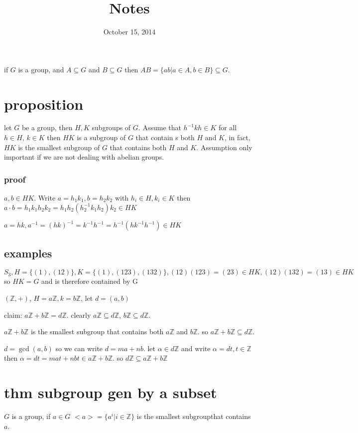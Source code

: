 \documentclass[letterpaper]{article}
\begin{document}
\title{Notes}
\date{October 15, 2014}
\maketitle
if $G$ is a group, and $A\subseteq G$ and $B\subseteq G$ then $AB=\{ab|a\in A, b\in B\}\subseteq G$.

\section*{proposition}

let $G$ be a group, then $H,K$ subgroups of $G$. Assume that $h^{-1}kh\in K$ for all $h\in H$, $k\in K$ then $HK$ is a subgroup of $G$ that contain s both $H$ and $K$, in fact, $HK$ is the smallest subgroup of $G$ that contains both $H$ and $K$. Assumption only important if we are not dealing with abelian groups.

\subsubsection*{proof}
$a,b\in HK$. Write $a=h_1k_1,b=h_2k_2$ with $h_i\in H,k_i\in K$ then $a\cdot b=h_1k_1h_2k_2=h_1h_2(h_2^{-1}k_1h_2)k_2\in HK$

$a=hk, a^{-1}=(hk)^{-1}=k^{-1}h^{-1}=h^{-1}(hk^{-1}h^{-1})\in HK$

\subsection*{examples}
$S_3, H=\{(1),(12)\}, K=\{(1),(123),(132)\}, (12)(123)=(23)\in HK, (12)(132)=(13)\in HK$ so $HK=G$ and is therefore contained by G

$(\mathbb{Z},+)$, $H=a\mathbb{Z}, k=b\mathbb{Z}$, let $d=(a,b)$

claim: $a\mathbb{Z}+b\mathbb{Z}=d\mathbb{Z}$. clearly $a\mathbb{Z}\subseteq d\mathbb{Z}$, $b\mathbb{Z}\subseteq d\mathbb{Z}$. 

$a\mathbb{Z}+b\mathbb{Z}$ is the smallest subgroup that contains both $a\mathbb{Z}$ and $b\mathbb{Z}$. so $a\mathbb{Z}+b\mathbb{Z}\subseteq d\mathbb{Z}$.

$d=\gcd(a,b)$ so we can write $d=ma+nb$. let $\alpha\in d\mathbb{Z}$ and write $\alpha=dt, t\in \mathbb{Z}$ then $\alpha=dt=mat+nbt\in a\mathbb{Z}+b\mathbb{Z}$. so $d\mathbb{Z}\subseteq a\mathbb{Z}+b\mathbb{Z}$ 
\section*{thm subgroup gen by a subset}
$G$ is a group, if $a\in G$ $<a>=\{a^i|i\in \mathbb{Z}\}$ is the smallest subgroupthat contains $a$.
\end{document}
